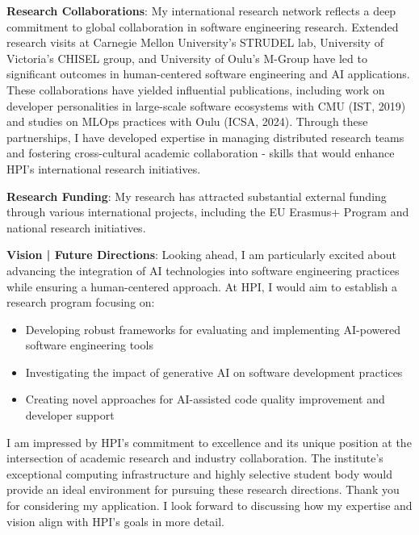\textbf{Research Collaborations}:
My international research network reflects a deep commitment to global collaboration in software engineering research. Extended research visits at Carnegie Mellon University's STRUDEL lab, University of Victoria's CHISEL group, and University of Oulu's M-Group have led to significant outcomes in human-centered software engineering and AI applications. These collaborations have yielded influential publications, including work on developer personalities in large-scale software ecosystems with CMU (IST, 2019) and studies on MLOps practices with Oulu (ICSA, 2024). Through these partnerships, I have developed expertise in managing distributed research teams and fostering cross-cultural academic collaboration - skills that would enhance HPI's international research initiatives.

\textbf{Research Funding}:
My research has attracted substantial external funding through various international projects, including the EU Erasmus+ Program and national research initiatives.

\textbf{Vision | Future Directions}:
Looking ahead, I am particularly excited about advancing the integration of AI technologies into software engineering practices while ensuring a human-centered approach. At HPI, I would aim to establish a research program focusing on:

\begin{itemize}
\item Developing robust frameworks for evaluating and implementing AI-powered software engineering tools
\item Investigating the impact of generative AI on software development practices
\item Creating novel approaches for AI-assisted code quality improvement and developer support
\end{itemize}

I am impressed by HPI's commitment to excellence and its unique position at the intersection of academic research and industry collaboration. The institute's exceptional computing infrastructure and highly selective student body would provide an ideal environment for pursuing these research directions.
Thank you for considering my application. I look forward to discussing how my expertise and vision align with HPI's goals in more detail.